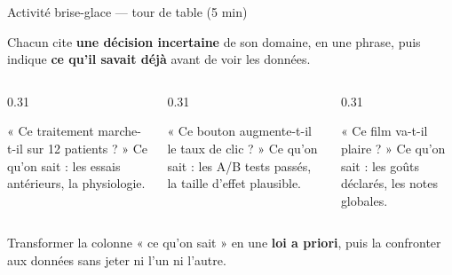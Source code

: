 \begin{frame}{Activité brise-glace — tour de table (5 min)}
\begin{abox}[Consigne]
Chacun cite \textbf{une décision incertaine} de son domaine, en une phrase, puis indique
\textbf{ce qu'il savait déjà} avant de voir les données.
\end{abox}
\vspace{1mm}
\begin{columns}[t]
\begin{column}{0.31\textwidth}
\begin{ebox}[Santé]
« Ce traitement marche-t-il sur 12 patients ? »
\vspace{1mm}
\footnotesize Ce qu'on sait : les essais antérieurs, la physiologie.
\end{ebox}
\end{column}
\begin{column}{0.31\textwidth}
\begin{ebox}
« Ce bouton augmente-t-il le taux de clic ? »
\vspace{1mm}
\footnotesize Ce qu'on sait : les A/B tests passés, la taille d'effet plausible.
\end{ebox}
\end{column}
\begin{column}{0.31\textwidth}
\begin{ebox}[Recommandation]
« Ce film va-t-il plaire ? »
\vspace{1mm}
\footnotesize Ce qu'on sait : les goûts déclarés, les notes globales.
\end{ebox}
\end{column}
\end{columns}
\vspace{2mm}
\begin{kbox}
Transformer la colonne « ce qu'on sait » en une \textbf{loi a priori}, puis la
confronter aux données sans jeter ni l'un ni l'autre.
\end{kbox}
\end{frame}

